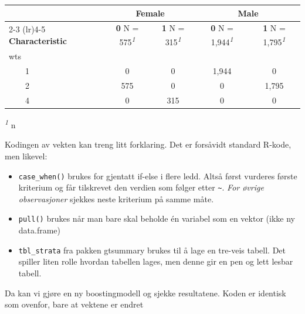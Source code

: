 \documentclass[
  letterpaper,
  DIV=11,
  numbers=noendperiod]{scrreprt}
\providecommand{\tightlist}{%
  \setlength{\itemsep}{0pt}\setlength{\parskip}{0pt}}
\begin{document}
\begin{table}
\fontsize{12.0pt}{14.0pt}\selectfont
\begin{tabular*}{\linewidth}{@{\extracolsep{\fill}}lcccc}
\toprule
 & \multicolumn{2}{c}{\textbf{Female}} & \multicolumn{2}{c}{\textbf{Male}} \\ 
\cmidrule(lr){2-3} \cmidrule(lr){4-5}
\textbf{Characteristic} & \textbf{0}  N = 575\textsuperscript{\textit{1}} & \textbf{1}  N = 315\textsuperscript{\textit{1}} & \textbf{0}  N = 1,944\textsuperscript{\textit{1}} & \textbf{1}  N = 1,795\textsuperscript{\textit{1}} \\ 
\midrule\addlinespace[2.5pt]
wts &  &  &  &  \\ 
    1 & 0 & 0 & 1,944 & 0 \\ 
    2 & 575 & 0 & 0 & 1,795 \\ 
    4 & 0 & 315 & 0 & 0 \\ 
\bottomrule
\end{tabular*}
\begin{minipage}{\linewidth}
\vspace{.05em}
\textsuperscript{\textit{1}} n\\
\end{minipage}
\end{table}

Kodingen av vekten kan treng litt forklaring. Det er forsåvidt standard
R-kode, men likevel:

\begin{itemize}
\tightlist
\item
  \texttt{case\_when()} brukes for gjentatt if-else i flere ledd. Altså
  først vurderes første kriterium og får tilskrevet den verdien som
  følger etter \texttt{\textasciitilde{}}. \emph{For øvrige
  observasjoner} sjekkes neste kriterium på samme måte.
\item
  \texttt{pull()} brukes når man bare skal beholde én variabel som en
  vektor (ikke ny data.frame)
\item
  \texttt{tbl\_strata} fra pakken gtsummary brukes til å lage en
  tre-veis tabell. Det spiller liten rolle hvordan tabellen lages, men
  denne gir en pen og lett lesbar tabell.
\end{itemize}

Da kan vi gjøre en ny boostingmodell og sjekke resultatene. Koden er
identisk som ovenfor, bare at vektene er endret
\end{document}
